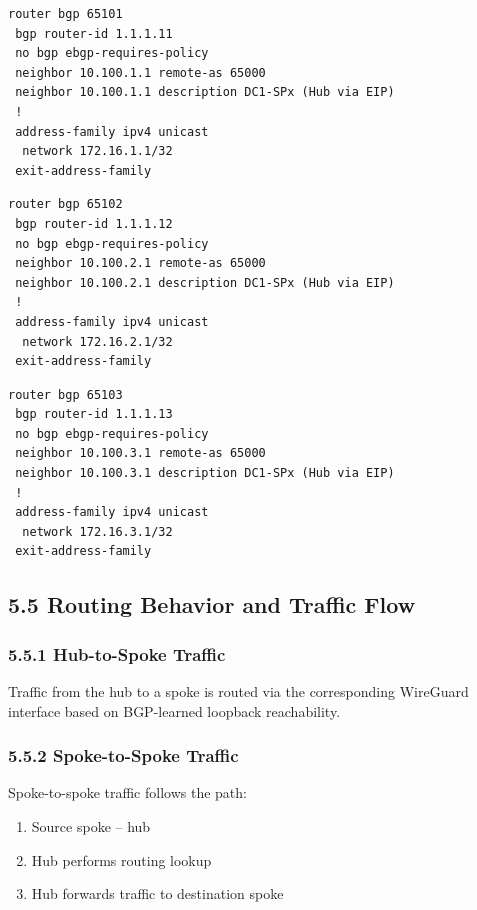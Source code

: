 \documentclass[11pt]{article}
\begin{document}
\begin{verbatim}
router bgp 65101
 bgp router-id 1.1.1.11
 no bgp ebgp-requires-policy
 neighbor 10.100.1.1 remote-as 65000
 neighbor 10.100.1.1 description DC1-SPx (Hub via EIP)
 !
 address-family ipv4 unicast
  network 172.16.1.1/32
 exit-address-family
\end{verbatim}

\begin{verbatim}
router bgp 65102
 bgp router-id 1.1.1.12
 no bgp ebgp-requires-policy
 neighbor 10.100.2.1 remote-as 65000
 neighbor 10.100.2.1 description DC1-SPx (Hub via EIP)
 !
 address-family ipv4 unicast
  network 172.16.2.1/32
 exit-address-family
\end{verbatim}

\begin{verbatim}
router bgp 65103
 bgp router-id 1.1.1.13
 no bgp ebgp-requires-policy
 neighbor 10.100.3.1 remote-as 65000
 neighbor 10.100.3.1 description DC1-SPx (Hub via EIP)
 !
 address-family ipv4 unicast
  network 172.16.3.1/32
 exit-address-family
\end{verbatim}

\subsection{5.5 Routing Behavior and Traffic Flow}
\label{sec:routing-behavior}

\subsubsection{5.5.1 Hub-to-Spoke Traffic}
\label{sec:hub-to-spoke}

Traffic from the hub to a spoke is routed via the corresponding WireGuard interface based on BGP-learned loopback reachability.

\subsubsection{5.5.2 Spoke-to-Spoke Traffic}
\label{sec:spoke-to-spoke}

Spoke-to-spoke traffic follows the path:

\begin{enumerate}
  \item Source spoke -- hub
  \item Hub performs routing lookup
  \item Hub forwards traffic to destination spoke
\end{enumerate}
\end{document}
